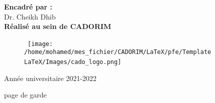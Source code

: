 \documentclass[a4paper, 12pt]{report}
\begin{document}
\begin{titlepage}
\begin{center}
			{\bf Encadré par :}\\
			{Dr. Cheikh Dhib} \\
			{\bf Réalisé au sein de CADORIM }
			
			
		\end{center}
		\begin{figure}[htbp]
		\hbox{
			\hspace*{5cm}
			\texttt{[image: /home/mohamed/mes\_fichier/CADORIM/LaTeX/pfe/Template LaTeX/Images/cado\_logo.png]}
		} 
		\end{figure}
		\vspace{1cm}
		\begin{center}
			Année universitaire 2021-2022
		\end{center}
	
		
	\end{titlepage}
	page de garde
	
\end{document}

